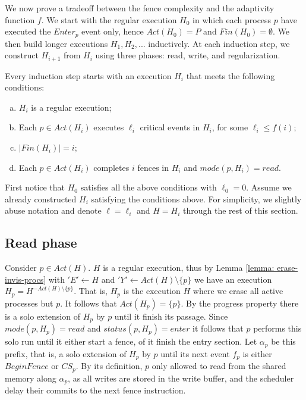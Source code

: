 We now prove a tradeoff between the fence complexity and the adaptivity function $f$.
We start with the regular execution $H_0$ in which each process $p$ have executed the $Enter_p$ event only, hence $Act(H_0)=P$ and $Fin(H_0)=\emptyset$. We then build longer executions $H_1,H_2,...$ inductively. At each induction step, we construct $H_{i+1}$ from $H_i$ using three phases: read, write, and regularization.

Every induction step starts with an execution $H_i$ that meets the following conditions:

\begin{enumerate}[(a)]
	\item $H_i$ is a regular execution;
	\item Each $p \in Act(H_i)$ executes $\ell_i$ critical events in $H_i$, for some $\ell_i \leq f(i)$;
	\item $|Fin(H_i)| = i$;
	\item Each $p \in Act(H_i)$ completes $i$ fences in $H_i$ and $mode(p,H_i) = read$.
\end{enumerate}

First notice that $H_0$ satisfies all the above conditions with $\ell_0 = 0$. Assume we already constructed $H_i$ satisfying the conditions above. For simplicity, we slightly abuse notation and denote $\ell = \ell_i$ and $H = H_i$ through the rest of this section.





\newpage
\subsection{Read phase} \label{subsec:read-phase}

Consider $p \in Act(H)$. $H$ is a regular execution, thus by Lemma \ref{lemma: erase-invis-procs} with $'E' \leftarrow H$ and $'Y' \leftarrow Act(H) \setminus \{p\}$ we have an execution $H_p = H^{-Act(H) \setminus \{p\}}$. That is, $H_p$ is the execution $H$ where we erase all active processes but $p$. It follows that $Act(H_p) = \{p\}$.
By the progress property there is a solo extension of $H_p$ by $p$ until it finish its passage. Since $mode(p,H_p) = read$ and $status(p,H_p) = enter$ it follows that $p$ performs this solo run until it either start a fence, of it finish the entry section. Let $\alpha_p$ be this prefix, that is, a solo extension of $H_p$ by $p$ until its next event $f_p$ is either $BeginFence$ or $CS_p$.
By its definition, $p$ only allowed to read from the shared memory along $\alpha_p$, as all writes are stored in the write buffer, and the scheduler delay their commits to the next fence instruction.

